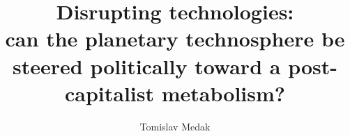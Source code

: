 \documentclass[a4paper, nobind]{templates/ociamthesis}
\title{Disrupting technologies:\\
can the planetary technosphere be steered politically toward a post-capitalist metabolism?}
\author{Tomislav Medak}
\begin{document}
\setlength{\textbaselineskip}{22pt plus2pt}

\setlength{\frontmatterbaselineskip}{17pt plus1pt minus1pt}

\setlength{\abstractseparatelineskip}{13pt plus1pt minus1pt}
\setlength{\abstractseparateparskip}{0pt plus 1pt}

\setlength{\parskip}{2pt plus 1pt}

%
%
\def\crest{{\texttt{[image: templates/CU\\\_logo.pdf]}}}
\renewcommand{\university}{Coventry University}
\renewcommand{\submittedtext}{A thesis submitted in partial fulfilment of the University's requirements for the degree of}
\renewcommand{\thesistitlesize}{\fontsize{22pt}{28pt}\selectfont}
\renewcommand{\gapbeforecrest}{25mm}
\renewcommand{\gapaftercrest}{25mm}


\setlength{\baselineskip}{\textbaselineskip}



\setcounter{secnumdepth}{2}
\setcounter{tocdepth}{1}
\setcounter{minitocdepth}{1}





\end{document}
